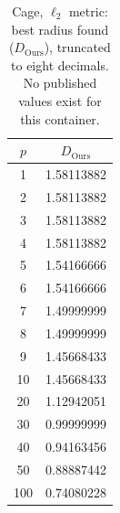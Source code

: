 \begin{table}[h!]
  \centering
  \caption{Cage, $\ell_2$ metric: best radius found ($D_{\mathrm{Ours}}$), truncated to eight decimals. No published values exist for this container.}
  \label{tab:cage_euclidean}
  \begin{tabular}{cc}
    \hline
    $p$ & $D_{\mathrm{Ours}}$ \\
    \hline
    1 & 1.58113882 \\
    2 & 1.58113882 \\
    3 & 1.58113882 \\
    4 & 1.58113882 \\
    5 & 1.54166666 \\
    6 & 1.54166666 \\
    7 & 1.49999999 \\
    8 & 1.49999999 \\
    9 & 1.45668433 \\
    10 & 1.45668433 \\
    20 & 1.12942051 \\
    30 & 0.99999999 \\
    40 & 0.94163456 \\
    50 & 0.88887442 \\
    100 & 0.74080228 \\
    \hline
  \end{tabular}
\end{table}
